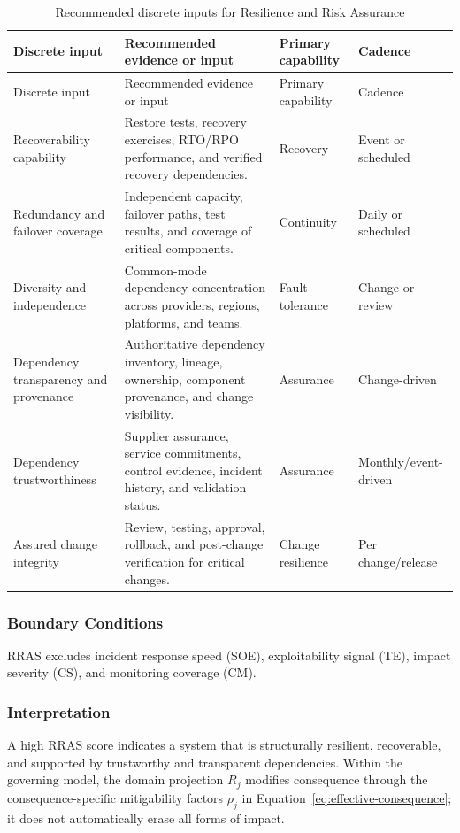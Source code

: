 \documentclass[11pt]{article}
\begin{document}
\begin{longtable}{P{0.18\textwidth} P{0.35\textwidth} P{0.18\textwidth} P{0.17\textwidth}}
  \caption{Recommended discrete inputs for Resilience and Risk Assurance}\\
  \toprule
  Discrete input & Recommended evidence or input & Primary capability & Cadence \\
  \midrule
  \endfirsthead
  \toprule
  Discrete input & Recommended evidence or input & Primary capability & Cadence \\
  \midrule
  \endhead
  Recoverability capability & Restore tests, recovery exercises, RTO/RPO performance, and verified recovery dependencies. & Recovery & Event or scheduled \\
  Redundancy and failover coverage & Independent capacity, failover paths, test results, and coverage of critical components. & Continuity & Daily or scheduled \\
  Diversity and independence & Common-mode dependency concentration across providers, regions, platforms, and teams. & Fault tolerance & Change or review \\
  Dependency transparency and provenance & Authoritative dependency inventory, lineage, ownership, component provenance, and change visibility. & Assurance & Change-driven \\
  Dependency trustworthiness & Supplier assurance, service commitments, control evidence, incident history, and validation status. & Assurance & Monthly/event-driven \\
  Assured change integrity & Review, testing, approval, rollback, and post-change verification for critical changes. & Change resilience & Per change/release \\
  \bottomrule
\end{longtable}

\subsubsection{Boundary Conditions}
RRAS excludes incident response speed (SOE), exploitability signal (TE), impact severity
(CS), and monitoring coverage (CM).

\subsubsection{Interpretation}
A high RRAS score indicates a system that is structurally resilient, recoverable, and
supported by trustworthy and transparent dependencies. Within the governing model,
the domain projection $R_j$ modifies consequence through the consequence-specific
mitigability factors $\rho_j$ in Equation~\ref{eq:effective-consequence}; it does not
automatically erase all forms of impact.
\end{document}
